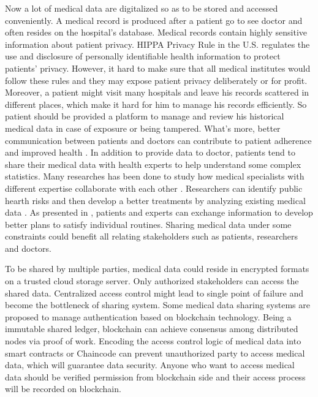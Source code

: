 \documentclass[conference]{IEEEtran}
\begin{document}
Now a lot of medical data are digitalized so as to be stored and accessed conveniently. A medical record is produced after a patient go to see doctor and often resides on the hospital's database. Medical records contain highly sensitive information about patient privacy. HIPPA Privacy Rule  \cite{centers2004hipaa} in the U.S. regulates the use and disclosure of personally identifiable health information to protect patients' privacy. However, it hard to make sure that all medical institutes would follow these rules and they may expose patient privacy deliberately or for profit. Moreover, a patient might visit many hospitals and leave his records scattered \cite{zhang2016secure} in different places, which make it hard for him to manage his records efficiently. So patient should be provided a platform to manage and review his historical medical data in case of exposure or being tampered. What's more, better communication between patients and doctors can contribute to patient adherence \cite{zolnierek2009physician} and  improved health \cite{street2009does}. In addition to provide data to doctor, patients tend to share their medical data with health experts to help understand some complex statistics. Many researches has been done to study how medical specialists with different expertise collaborate with each other \cite{fitzpatrick2013review}.  Researchers can identify public hearth risks and then develop a better treatments by analyzing existing medical data \cite{office2015report}. As presented in \cite{chung2018using},  patients and experts can exchange information to develop better plans to satisfy individual routines. Sharing medical data under some constraints could benefit all relating stakeholders such as patients, researchers and doctors. 

To be shared by multiple parties, medical data could reside in encrypted formats on a trusted cloud storage server. Only authorized stakeholders can access the shared data. Centralized access control might lead to single point of failure and become the bottleneck of sharing system. Some medical data sharing systems \cite{azaria2016medrec,fan2018medblock,xia2017bbds} are proposed to manage authentication based on blockchain\cite{nakamoto2008bitcoin} technology. Being a immutable shared ledger, blockchain can achieve consensus among distributed nodes via proof of work. Encoding the access control logic of medical data into smart contracts\cite{azaria2016medrec} or Chaincode \cite{dubovitskaya2017secure} can prevent unauthorized party to access medical data, which will guarantee data security. Anyone who want to access medical data should be verified permission from blockchain side and their access process will be recorded on blockchain.
\end{document}
